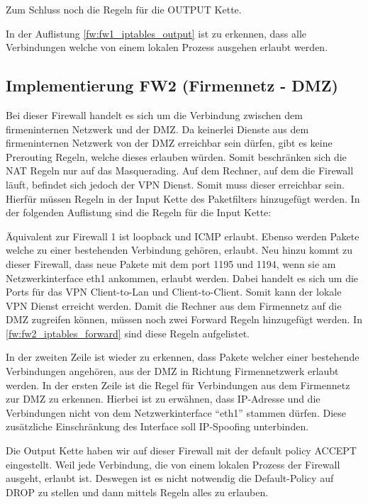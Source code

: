Zum Schluss noch die Regeln für die OUTPUT Kette.

In der Auflistung \ref{fw:fw1_iptables_output} ist zu erkennen, dass alle Verbindungen welche von einem lokalen Prozess ausgehen erlaubt werden.

\subsection{Implementierung FW2 (Firmennetz - DMZ)}
Bei dieser Firewall handelt es sich um die Verbindung zwischen dem firmeninternen Netzwerk und der DMZ. Da keinerlei Dienste aus dem firmeninternen Netzwerk von der DMZ erreichbar sein dürfen, gibt es keine Prerouting Regeln, welche dieses erlauben würden. Somit beschränken sich die NAT Regeln nur auf das Masquerading.
Auf dem Rechner, auf dem die Firewall läuft, befindet sich jedoch der VPN Dienst. Somit muss dieser erreichbar sein. Hierfür müssen Regeln in der Input Kette des Paketfilters hinzugefügt werden. In der folgenden Auflistung sind die Regeln für die Input Kette:

Äquivalent zur Firewall 1 ist loopback und ICMP erlaubt. Ebenso werden Pakete welche zu einer bestehenden Verbindung gehören, erlaubt. Neu hinzu kommt zu dieser Firewall, dass neue Pakete mit dem port 1195 und 1194, wenn sie am Netzwerkinterface eth1 ankommen, erlaubt werden. Dabei handelt es sich um die Ports für das VPN Client-to-Lan und Client-to-Client. Somit kann der lokale VPN Dienst erreicht werden.
Damit die Rechner aus dem Firmennetz auf die DMZ zugreifen können, müssen noch zwei Forward Regeln hinzugefügt werden. In \ref{fw:fw2_iptables_forward} sind diese Regeln aufgelistet.

In der zweiten Zeile ist wieder zu erkennen, dass Pakete welcher einer bestehende Verbindungen angehören, aus der DMZ in Richtung Firmennetzwerk erlaubt werden. In der ersten Zeile ist die Regel für Verbindungen aus dem Firmennetz zur DMZ zu erkennen. Hierbei ist zu erwähnen, dass IP-Adresse und die Verbindungen nicht von dem Netzwerkinterface "`eth1"' stammen dürfen. Diese zusätzliche Einschränkung des Interface soll IP-Spoofing unterbinden.

Die Output Kette haben wir auf dieser Firewall mit der default policy ACCEPT eingestellt. Weil jede Verbindung, die von einem lokalen Prozess der Firewall ausgeht, erlaubt ist. Deswegen ist es nicht notwendig die Default-Policy auf DROP zu stellen und dann mittels Regeln alles zu erlauben.
